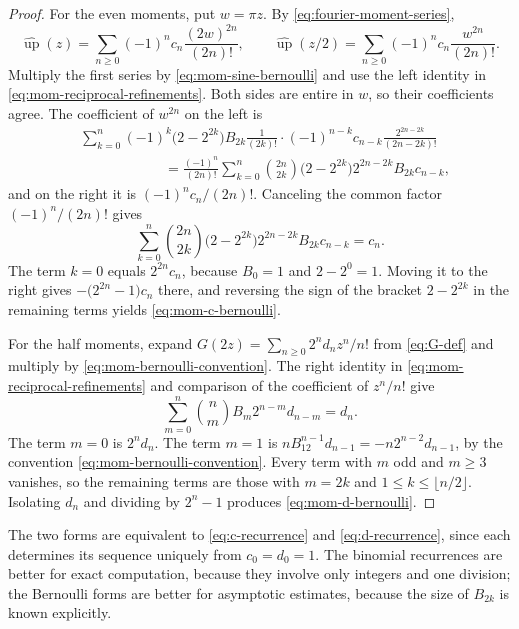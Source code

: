 \documentclass[11pt,oneside]{article}
\theoremstyle{definition}
\theoremstyle{remark}
\newcommand{\Up}{\operatorname{up}}
\begin{document}
\begin{proof}
For the even moments, put $w=\pi z$.  By \eqref{eq:fourier-moment-series},
\begin{equation*}
 \widehat{\Up}(z)=\sum_{n\ge0}(-1)^nc_n\frac{(2w)^{2n}}{(2n)!},
 \qquad
 \widehat{\Up}(z/2)=\sum_{n\ge0}(-1)^nc_n\frac{w^{2n}}{(2n)!}.
\end{equation*}
Multiply the first series by \eqref{eq:mom-sine-bernoulli} and use the left identity in
\eqref{eq:mom-reciprocal-refinements}.  Both sides are entire in $w$, so their coefficients
agree.  The coefficient of $w^{2n}$ on the left is
\begin{align*}
 &\sum_{k=0}^{n}(-1)^k\bigl(2-2^{2k}\bigr)B_{2k}\frac{1}{(2k)!}
 \cdot(-1)^{n-k}c_{n-k}\frac{2^{2n-2k}}{(2n-2k)!}\\
 &\hspace{6em}=\frac{(-1)^n}{(2n)!}\sum_{k=0}^{n}
 \binom{2n}{2k}\bigl(2-2^{2k}\bigr)2^{2n-2k}B_{2k}c_{n-k},
\end{align*}
and on the right it is $(-1)^nc_n/(2n)!$.  Canceling the common factor $(-1)^n/(2n)!$ gives
\begin{equation*}
 \sum_{k=0}^{n}\binom{2n}{2k}\bigl(2-2^{2k}\bigr)2^{2n-2k}B_{2k}c_{n-k}=c_n.
\end{equation*}
The term $k=0$ equals $2^{2n}c_n$, because $B_0=1$ and $2-2^0=1$.  Moving it to the right
gives $-\bigl(2^{2n}-1\bigr)c_n$ there, and reversing the sign of the bracket
$2-2^{2k}$ in the remaining terms yields \eqref{eq:mom-c-bernoulli}.

For the half moments, expand $G(2z)=\sum_{n\ge0}2^nd_nz^n/n!$ from \eqref{eq:G-def} and
multiply by \eqref{eq:mom-bernoulli-convention}.  The right identity in
\eqref{eq:mom-reciprocal-refinements} and comparison of the coefficient of $z^n/n!$ give
\begin{equation*}
 \sum_{m=0}^{n}\binom{n}{m}B_m2^{n-m}d_{n-m}=d_n.
\end{equation*}
The term $m=0$ is $2^nd_n$.  The term $m=1$ is
$n B_12^{n-1}d_{n-1}=-n2^{n-2}d_{n-1}$, by the convention
\eqref{eq:mom-bernoulli-convention}.  Every term with $m$ odd and $m\ge3$ vanishes, so the
remaining terms are those with $m=2k$ and $1\le k\le\lfloor n/2\rfloor$.  Isolating $d_n$ and
dividing by $2^n-1$ produces \eqref{eq:mom-d-bernoulli}.
\end{proof}

The two forms are equivalent to \eqref{eq:c-recurrence} and \eqref{eq:d-recurrence}, since
each determines its sequence uniquely from $c_0=d_0=1$.  The binomial recurrences are better
for exact computation, because they involve only integers and one division; the Bernoulli
forms are better for asymptotic estimates, because the size of $B_{2k}$ is known explicitly.
\end{document}
